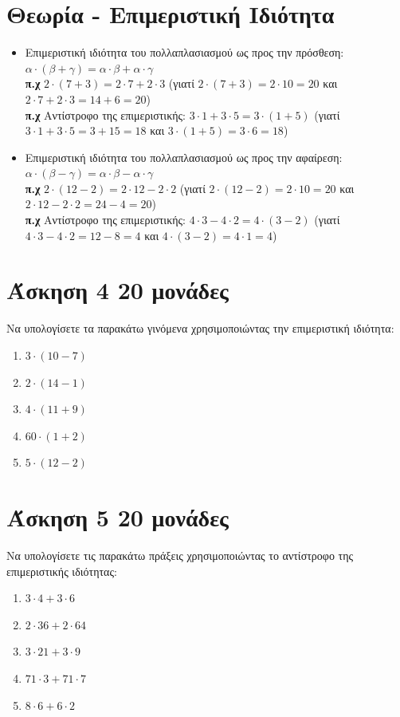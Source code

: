 \documentclass[a4paper,10pt]{report}
\begin{document}
\section*{Θεωρία - Επιμεριστική Ιδιότητα  \hfill \small{}}
\begin{itemize}
 \item Επιμεριστική ιδιότητα του πολλαπλασιασμού ως προς την πρόσθεση: $α \cdot (β+γ)=α\cdot β+α\cdot γ$ \\
 \textbf{π.χ } $2\cdot(7+3)=2\cdot7+2\cdot3$ (γιατί $2\cdot (7+3)=2\cdot 10=20$ και $2\cdot7+2\cdot3=14+6=20$) \\ 
 \textbf{π.χ }Αντίστροφο της επιμεριστικής: $3\cdot1+3\cdot5=3\cdot(1+5)$  
(γιατί $3\cdot 1+3\cdot5=3+15=18$ και $3\cdot(1+5)=3\cdot6=18$) \\ 
 \item Επιμεριστική ιδιότητα του πολλαπλασιασμού ως προς την αφαίρεση: $α \cdot (β-γ)=α\cdot β-α\cdot γ$ \\
 \textbf{π.χ } $2\cdot(12-2)=2\cdot12-2\cdot2$ (γιατί $2\cdot (12-2)=2\cdot 10=20$ και $2\cdot12-2\cdot2=24-4=20$) \\ 
 \textbf{π.χ }Αντίστροφο της επιμεριστικής: $4\cdot3- 4\cdot2=4\cdot(3-2)$  
(γιατί $4\cdot 3 -4\cdot2=12-8=4$ και $4\cdot(3-2)=4\cdot1=4$) \\
\end{itemize}


\section*{Άσκηση 4  \hfill \small{20 μονάδες}}
Να υπολογίσετε τα παρακάτω γινόμενα χρησιμοποιώντας την επιμεριστική ιδιότητα: 
\begin{enumerate} [1)]
 \item $3\cdot (10-7)$
 \item $2\cdot (14-1)$
 \item $4\cdot (11+9)$
 \item $60\cdot (1+2)$
 \item $5\cdot (12-2)$
\end{enumerate}



\section*{Άσκηση 5  \hfill \small{20 μονάδες}}
Να υπολογίσετε τις παρακάτω πράξεις χρησιμοποιώντας το αντίστροφο της επιμεριστικής ιδιότητας: 
\begin{enumerate} [1)]
 \item $3\cdot4  +3\cdot 6$
 \item $2\cdot36  +2\cdot 64$
 \item $3\cdot21  +3\cdot 9$
 \item $71\cdot3  +71\cdot 7$
 \item $8\cdot6  +6\cdot 2$
\end{enumerate}
\end{document}
